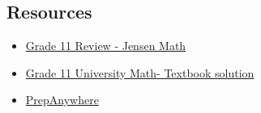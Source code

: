 \documentclass[12pt,a4paper]{article}
\begin{document}
\newpage
\subsection*{Resources}
\begin{itemize}
    \item \href{https://www.jensenmath.ca/math11-review}{Grade 11 Review - Jensen Math}
    \item \href{https://sites.google.com/a/hdsb.ca/mrturingia/home/grade-11-university-math}{Grade 11 University Math- Textbook solution}
    \item \href{https://app.prepanywhere.com/student/prep/textbooks/11-functions-harcourt}{PrepAnywhere}
\end{itemize}
\end{document}
